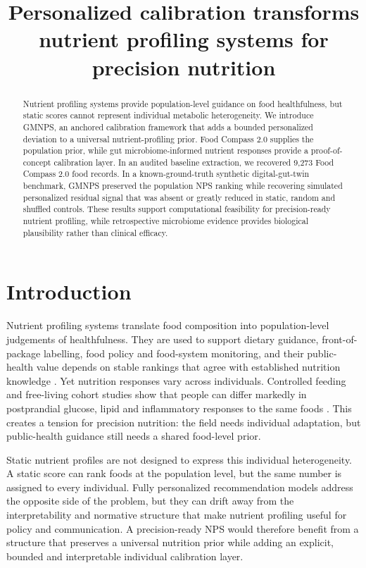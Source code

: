 \title{Personalized calibration transforms nutrient profiling systems for precision nutrition}

\begin{abstract}
Nutrient profiling systems provide population-level guidance on food
healthfulness, but static scores cannot represent individual metabolic
heterogeneity. We introduce GMNPS, an anchored calibration framework that adds a
bounded personalized deviation to a universal nutrient-profiling prior. Food
Compass 2.0 supplies the population prior, while gut microbiome-informed
nutrient responses provide a proof-of-concept calibration layer. In an audited
baseline extraction, we recovered 9,273 Food Compass 2.0 food records. In a
known-ground-truth synthetic digital-gut-twin benchmark, GMNPS preserved the
population NPS ranking while recovering simulated personalized residual signal
that was absent or greatly reduced in static, random and shuffled controls.
These results support computational feasibility for precision-ready nutrient
profiling, while retrospective microbiome evidence provides biological
plausibility rather than clinical efficacy.
\end{abstract}

\section*{Introduction}

Nutrient profiling systems translate food composition into population-level
judgements of healthfulness. They are used to support dietary guidance,
front-of-package labelling, food policy and food-system monitoring, and their
public-health value depends on stable rankings that agree with established
nutrition knowledge \cite{mozaffarian2021foodcompass,barrett2024foodcompass2}.
Yet nutrition responses vary across individuals. Controlled feeding and
free-living cohort studies show that people can differ markedly in
postprandial glucose, lipid and inflammatory responses to the same foods
\cite{zeevi2015personalized,berry2020postprandial}. This creates a tension for
precision nutrition: the field needs individual adaptation, but public-health
guidance still needs a shared food-level prior.

Static nutrient profiles are not designed to express this individual
heterogeneity. A static score can rank foods at the population level, but the
same number is assigned to every individual. Fully personalized recommendation
models address the opposite side of the problem, but they can drift away from
the interpretability and normative structure that make nutrient profiling useful
for policy and communication. A precision-ready NPS would therefore benefit from
a structure that preserves a universal nutrition prior while adding an explicit,
bounded and interpretable individual calibration layer.

